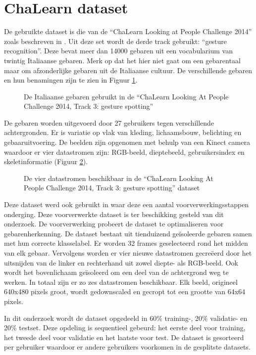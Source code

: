 \section{ChaLearn dataset}
De gebruikte dataset is die van de ``ChaLearn Looking at People Challenge 2014'' zoals beschreven in \cite{escalera_chalearn_2014}. Uit deze set wordt de derde track gebruikt: ``gesture recognition''. Deze bevat meer dan 14000 gebaren uit een vocabularium van twintig Italiaanse gebaren. Merk op dat het hier niet gaat om een gebarentaal maar om afzonderlijke gebaren uit de Italiaanse cultuur. De verschillende gebaren en hun benamingen zijn te zien in Figuur \ref{fig:gebaren}.
\begin{figure}
	\centering
	\def\svgwidth{\columnwidth}
	
	\caption{De Italiaanse gebaren gebruikt in de ``ChaLearn Looking At People Challenge 2014, Track 3: gesture spotting''}
	\label{fig:gebaren}
\end{figure}
\npar De gebaren worden uitgevoerd door 27 gebruikers tegen verschillende achtergronden. Er is variatie op vlak van kleding, lichaamsbouw, belichting en gebaaruitvoering. De beelden zijn opgenomen met behulp van een Kinect camera waardoor er vier datastromen zijn: RGB-beeld, dieptebeeld, gebruikersindex en skeletinformatie (Figuur \ref{fig:chalearn-data}).
\begin{figure}
	\centering
	\def\svgwidth{\columnwidth}
	
	\caption{De vier datastromen beschikbaar in de ``ChaLearn Looking At People Challenge 2014, Track 3: gesture spotting'' dataset}
	\label{fig:chalearn-data}
\end{figure}
\npar Deze dataset werd ook gebruikt in \cite{lionel} waar deze een aantal voorverwerkingsstappen onderging. Deze voorverwerkte dataset is ter beschikking gesteld van dit onderzoek. De voorverwerking probeert de dataset te optimaliseren voor gebarenherkenning. De dataset bestaat uit tienduizend ge\"isoleerde gebaren samen met hun correcte klasselabel. Er worden 32 frames geselecteerd rond het midden van elk gebaar. Vervolgens worden er vier nieuwe datastromen gecre\"eerd door het uitsnijden van de linker en rechterhand uit zowel diepte- als RGB-beeld. Ook wordt het bovenlichaam ge\"isoleerd om een deel van de achtergrond weg te werken. In totaal zijn er zo zes datastromen beschikbaar. Elk beeld, origineel 640x480 pixels groot, wordt gedownscaled en gecropt tot een grootte van 64x64 pixels. 

\npar In dit onderzoek wordt de dataset opgedeeld in 60\% training-, 20\% validatie- en 20\% testset. Deze opdeling is sequentieel gebeurd: het eerste deel voor training, het tweede deel voor validatie en het laatste voor test. De dataset is gesorteerd per gebruiker waardoor er andere gebruikers voorkomen in de gesplitste datasets.


